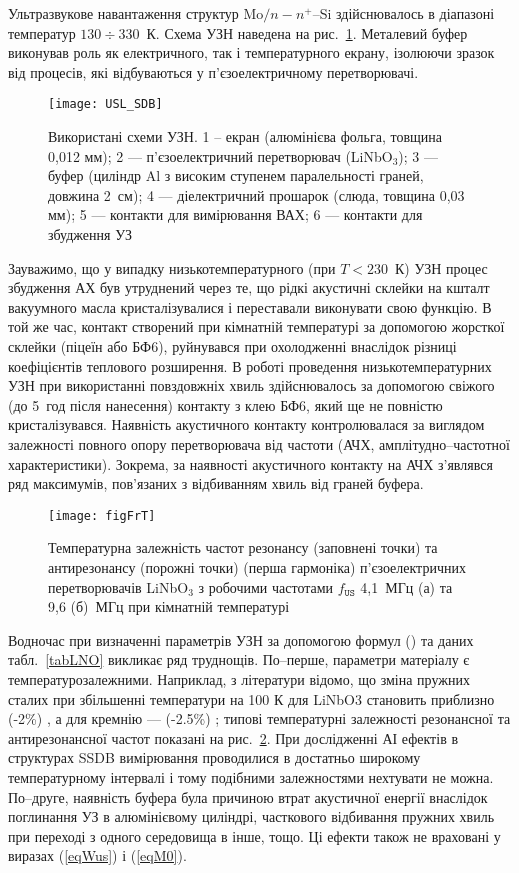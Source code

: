 Ультразвукове навантаження структур Mo$/n-n^+$--Si здійснювалось в діапазоні температур $130\div330$~К.
Схема УЗН наведена на рис.~\ref{figUSL:SDB}.
Металевий буфер виконував роль як електричного, так і температурного екрану, ізолюючи зразок від процесів, які відбуваються у
п'єзоелектричному перетворювачі.


\begin{figure}[b]
\center
\texttt{[image: USL\_SDB]}%
\caption{\label{figUSL:SDB}
Використані схеми УЗН.
1 --  екран (алюмінієва фольга, товщина 0,012 мм);
2 --- п'єзоелектричний перетворювач (LiNbO$_3$);
3 --- буфер (циліндр Al з високим ступенем паралельності граней, довжина 2~см);
4 --- діелектричний прошарок (слюда, товщина 0,03 мм);
5 --- контакти для вимірювання ВАХ;
6 --- контакти для збудження УЗ
}
\end{figure}


Зауважимо, що у випадку низькотемпературного (при $T<230$~К) УЗН процес збудження АХ був утруднений через те, що
рідкі акустичні склейки на кшталт вакуумного масла кристалізувалися і переставали виконувати свою функцію.
В той же час, контакт створений при кімнатній температурі за допомогою жорсткої склейки (піцеїн або БФ6),
руйнувався при охолодженні внаслідок різниці коефіцієнтів теплового розширення.
В роботі проведення низькотемпературних УЗН при використанні повздовжніх хвиль здійснювалось за допомогою свіжого (до 5~год після нанесення) контакту з клею БФ6,
який ще не повністю кристалізувався.
Наявність акустичного контакту контролювалася за виглядом залежності повного опору перетворювача від частоти (АЧХ, амплітудно--частотної характеристики).
Зокрема, за наявності акустичного контакту на АЧХ з'являвся ряд максимумів, пов'язаних з відбиванням хвиль від граней буфера.

\begin{figure}
\center
\texttt{[image: figFrT]}%
\caption{\label{figFrT}
Температурна залежність частот резонансу (заповнені точки) та антирезонансу (порожні точки) (перша гармоніка)
п'єзоелектричних перетворювачів LiNbO$_3$ з робочими частотами $f_\mathtt{US}$ 4,1~МГц (а) та 9,6 (б)~МГц при кімнатній температурі
}
\end{figure}


Водночас при визначенні параметрів УЗН за допомогою формул () та даних табл.~\ref{tabLNO} викликає ряд труднощів.
По--перше, параметри матеріалу є температурозалежними.
Наприклад, з літератури відомо, що зміна пружних сталих при збільшенні температури на 100 К для LiNbO3 становить приблизно (-2\%) \cite{LNO_C:Temp},
а для кремнію --- (-2.5\%) \cite{Si_C:Temp};
типові температурні залежності резонансної та антирезонансної частот показані на рис.~\ref{figFrT}.
При дослідженні АІ ефектів в структурах SSDB вимірювання проводилися в достатньо широкому температурному інтервалі і тому подібними залежностями нехтувати не можна.
По--друге, наявність буфера була причиною втрат акустичної енергії внаслідок поглинання УЗ в алюмінієвому циліндрі, часткового відбивання пружних хвиль
при переході з одного середовища в інше, тощо.
Ці ефекти також не враховані у виразах (\ref{eqWus}) і  (\ref{eqM0}).



